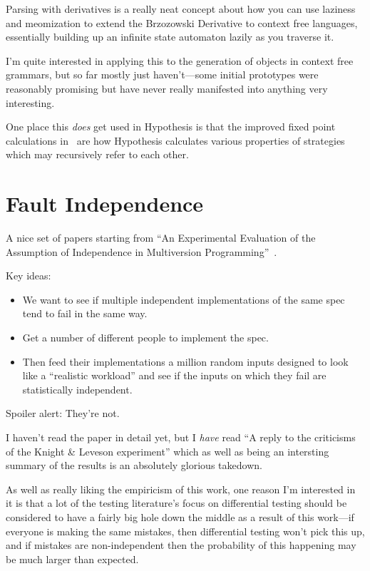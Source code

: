 Parsing with derivatives\cite{DBLP:conf/icfp/MightDS11, DBLP:conf/pldi/0001HM16} is a really neat concept about how you can use laziness and meomization to extend the Brzozowski Derivative to context free languages,
essentially building up an infinite state automaton lazily as you traverse it.

I'm quite interested in applying this to the generation of objects in context free grammars,
but so far mostly just haven't---some
initial prototypes were reasonably promising but have never really manifested into anything very interesting.

One place this \emph{does} get used in Hypothesis is that the improved fixed point calculations in~\cite{DBLP:conf/pldi/0001HM16} are how Hypothesis calculates various properties of strategies which may recursively refer to each other.

\section{Fault Independence}

A nice set of papers starting from ``An Experimental Evaluation of the Assumption of Independence in Multiversion Programming''~\cite{DBLP:journals/tse/KnightL86}.

Key ideas:

\begin{itemize}
\item We want to see if multiple independent implementations of the same spec tend to fail in the same way.
\item Get a number of different people to implement the spec.
\item Then feed their implementations a million random inputs designed to look like a ``realistic workload'' and see if the inputs on which they fail are statistically independent.
\end{itemize}

Spoiler alert: They're not.

I haven't read the paper in detail yet,
but I \emph{have} read ``A reply to the criticisms of the Knight \& Leveson experiment''\cite{knight1990reply} which as well as being an intersting summary of the results is an absolutely glorious takedown.

As well as really liking the empiricism of this work,
one reason I'm interested in it is that a lot of the testing literature's focus on differential testing should be considered to have a fairly big hole down the middle as a result of this work---if everyone is making the same mistakes,
then differential testing won't pick this up,
and if mistakes are non-independent then the probability of this happening may be much larger than expected.

